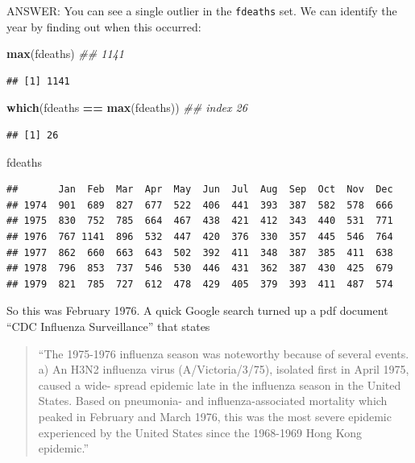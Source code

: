 \documentclass[]{book}
\newenvironment{Shaded}{\begin{snugshade}}{\end{snugshade}}
\newcommand{\CommentTok}[1]{\textcolor[rgb]{0.56,0.35,0.01}{\textit{#1}}}
\newcommand{\KeywordTok}[1]{\textcolor[rgb]{0.13,0.29,0.53}{\textbf{#1}}}
\newcommand{\NormalTok}[1]{#1}
\newcommand{\OperatorTok}[1]{\textcolor[rgb]{0.81,0.36,0.00}{\textbf{#1}}}
\newcommand{\StringTok}[1]{\textcolor[rgb]{0.31,0.60,0.02}{#1}}
\begin{document}
ANSWER: You can see a single outlier in the \texttt{fdeaths} set. We can identify the year by finding out when this occurred:

\begin{Shaded}
\begin{Highlighting}[]
\KeywordTok{max}\NormalTok{(fdeaths) }\CommentTok{## 1141}
\end{Highlighting}
\end{Shaded}

\begin{verbatim}
## [1] 1141
\end{verbatim}

\begin{Shaded}
\begin{Highlighting}[]
\KeywordTok{which}\NormalTok{(fdeaths }\OperatorTok{==}\StringTok{ }\KeywordTok{max}\NormalTok{(fdeaths)) }\CommentTok{## index 26}
\end{Highlighting}
\end{Shaded}

\begin{verbatim}
## [1] 26
\end{verbatim}

\begin{Shaded}
\begin{Highlighting}[]
\NormalTok{fdeaths}
\end{Highlighting}
\end{Shaded}

\begin{verbatim}
##       Jan  Feb  Mar  Apr  May  Jun  Jul  Aug  Sep  Oct  Nov  Dec
## 1974  901  689  827  677  522  406  441  393  387  582  578  666
## 1975  830  752  785  664  467  438  421  412  343  440  531  771
## 1976  767 1141  896  532  447  420  376  330  357  445  546  764
## 1977  862  660  663  643  502  392  411  348  387  385  411  638
## 1978  796  853  737  546  530  446  431  362  387  430  425  679
## 1979  821  785  727  612  478  429  405  379  393  411  487  574
\end{verbatim}

So this was February 1976. A quick Google search turned up a pdf document ``CDC Influenza Surveillance'' that states

\begin{quote}
``The 1975-1976 influenza season was noteworthy because of several events. a) An H3N2 influenza virus (A/Victoria/3/75), isolated first in April 1975, caused a wide- spread epidemic late in the influenza season in the United States. Based on pneumonia- and influenza-associated mortality which peaked in February and March 1976, this was the most severe epidemic experienced by the United States since the 1968-1969 Hong Kong epidemic.''
\end{quote}
\end{document}
